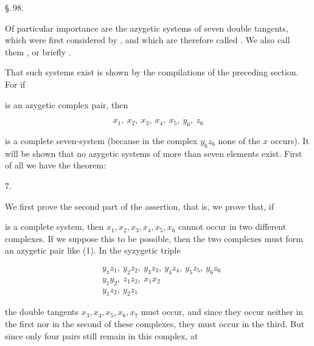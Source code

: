 \S.\,98.


Of particular importance are the azygetic systems of seven double tangents, which were first considered by , and which are therefore called . We also call them , or briefly .

That such systems exist is shown by the compilations of the preceding section. For if


is an azygetic complex pair, then

\[ x_1,\ x_2,\ x_3,\ x_4,\ x_5,\ y_6,\ z_6 \]

is a complete seven-system (because in the complex $y_6 z_6$ none of the $x$ occurs). It will be shown that no azygetic systems of more than seven elements exist. First of all we have the theorem:

7. 

We first prove the second part of the assertion, that is, we prove that, if


is a complete system, then $x_1, x_2, x_3, x_4, x_5, x_6$ cannot occur in two different complexes. If we suppose this to be possible, then the two complexes must form an azygetic pair like (1). In the syzygetic triple

\[\begin{aligned}
&y_1 z_1,\ y_2 z_2,\ y_3 z_3,\ y_4 z_4,\ y_5 z_5,\ y_6 z_6\\
&y_1 y_2,\ z_1 z_2,\ x_1 x_2\\
&y_1 z_2,\ y_2 z_1
\end{aligned}\]

the double tangents $x_3, x_4, x_5, x_6, x_7$ must occur, and since they occur neither in the first nor in the second of these complexes, they must occur in the third. But since only four pairs still remain in this complex, at
